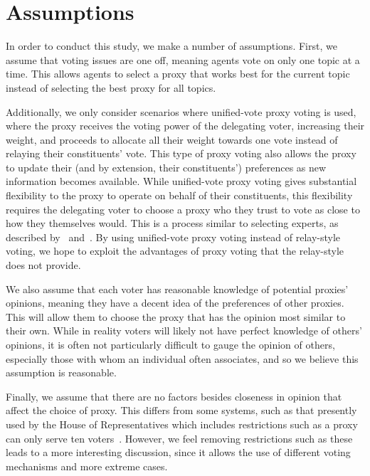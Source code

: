 \section{Assumptions}\label{sec:\chptindicator-assumptions}
In order to conduct this study, we make a number of assumptions.
First, we assume that voting issues are one off, meaning agents vote on only one
topic at a time.
This allows agents to select a proxy that works best for the current topic instead of
selecting the best proxy for all topics.

Additionally, we only consider scenarios where unified-vote proxy voting is used, where
the proxy receives the voting power of the delegating voter, increasing their weight,
and proceeds to allocate all their weight towards one vote instead of relaying their
constituents' vote.
This type of proxy voting also allows the proxy to update their (and by extension, their
constituents') preferences as new information becomes available.
While unified-vote proxy voting gives substantial flexibility to the proxy to operate
on behalf of their constituents, this flexibility requires the delegating voter to
choose a proxy who they trust to vote as close to how they themselves would.
This is a process similar to selecting experts, as described by~\cite{Miller1969}
and~\cite{Mueller1972}.
By using unified-vote proxy voting instead of relay-style voting, we hope to exploit
the advantages of proxy voting that the relay-style does not provide.

We also assume that each voter has reasonable knowledge of potential proxies'
opinions, meaning they have a decent idea of the preferences of other proxies.
This will allow them to choose the proxy that has the opinion most similar to their own.
While in reality voters will likely not have perfect knowledge of others' opinions,
it is often not particularly difficult to gauge the opinion of others, especially
those with whom an individual often associates, and so we believe this assumption is
reasonable.

Finally, we assume that there are no factors besides closeness in opinion that affect
the choice of proxy.
This differs from some systems, such as that presently used by the House of
Representatives which includes restrictions such as a proxy can only serve ten
voters~\cite{CERP2020}.
However, we feel removing restrictions such as these leads to a more interesting
discussion, since it allows the use of different voting mechanisms and more extreme
cases.
